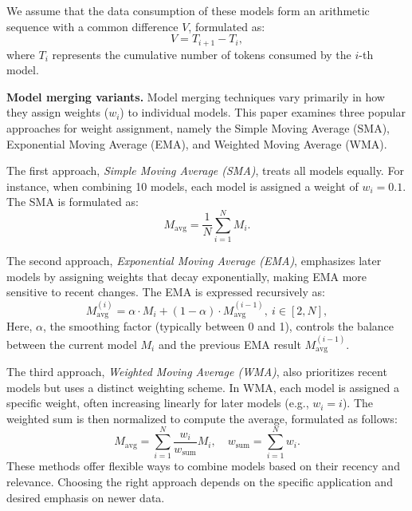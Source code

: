 We assume that the data consumption of these models form an arithmetic sequence with a common difference $V$, formulated as:
\begin{equation}
V = T_{i+1} - T_{i},
\end{equation}
where \( T_i \) represents the cumulative number of tokens consumed by the \( i \)-th model.

\textbf{Model merging variants.}
Model merging techniques vary primarily in how they assign weights (\( w_i \)) to individual models. This paper examines three popular approaches for weight assignment, namely the Simple Moving Average (SMA), Exponential Moving Average (EMA), and Weighted Moving Average (WMA).

The first approach, \textit{Simple Moving Average (SMA)}, treats all models equally. For instance, when combining 10 models, each model is assigned a weight of \( w_i = 0.1 \). The SMA is formulated as:
\begin{equation}
M_{\text{avg}} = \frac{1}{N} \sum_{i=1}^{N} M_i.
\end{equation}

The second approach, \textit{Exponential Moving Average (EMA)}, emphasizes later models by assigning weights that decay exponentially, making EMA more sensitive to recent changes. The EMA is expressed recursively as:
\begin{equation}
M_{\text{avg}}^{(i)} = \alpha \cdot M_i + (1 - \alpha) \cdot M_{\text{avg}}^{(i-1)},\  i\in [2,N],
\end{equation}
Here, \( \alpha \), the smoothing factor (typically between 0 and 1), controls the balance between the current model \( M_i \) and the previous EMA result \( M_{\text{avg}}^{(i-1)} \).

The third approach, \textit{Weighted Moving Average (WMA)}, also prioritizes recent models but uses a distinct weighting scheme. In WMA, each model is assigned a specific weight, often increasing linearly for later models (e.g., \( w_i = i \)). The weighted sum is then normalized to compute the average, formulated as follows:
\begin{equation}
M_{\text{avg}} = {\sum_{i=1}^{N} \frac{w_i}{w_{\text{sum}}} M_i},\quad w_{\text{sum}} = \sum_{i=1}^{N} w_i.
\end{equation}
These methods offer flexible ways to combine models based on their recency and relevance. Choosing the right approach depends on the specific application and desired emphasis on newer data.
